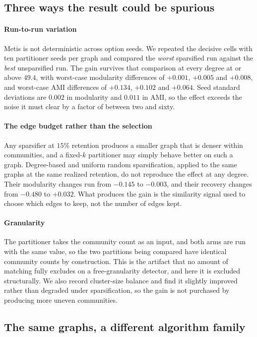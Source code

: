 \subsection{Three ways the result could be spurious}

\paragraph{Run-to-run variation}
Metis is not deterministic across option seeds. We repeated the decisive cells
with ten partitioner seeds per graph and compared the \emph{worst} sparsified run
against the \emph{best} unsparsified run. The gain survives that comparison at
every degree at or above $49.4$, with worst-case modularity differences of
$+0.001$, $+0.005$ and $+0.008$, and worst-case AMI differences of $+0.134$,
$+0.102$ and $+0.064$. Seed standard deviations are $0.002$ in modularity and
$0.011$ in AMI, so the effect exceeds the noise it must clear by a factor of
between two and sixty.

\paragraph{The edge budget rather than the selection}
Any sparsifier at $15\%$ retention produces a smaller graph that is denser within
communities, and a fixed-$k$ partitioner may simply behave better on such a
graph. Degree-based and uniform random sparsification, applied to the same graphs
at the same realized retention, do not reproduce the effect at any degree. Their
modularity changes run from $-0.145$ to $-0.003$, and their recovery changes from
$-0.480$ to $+0.032$. What produces the gain is the similarity signal used to
choose which edges to keep, not the number of edges kept.

\paragraph{Granularity}
The partitioner takes the community count as an input, and both arms are run with
the same value, so the two partitions being compared have identical community
counts by construction. This is the artifact that no amount of matching fully
excludes on a free-granularity detector, and here it is excluded structurally. We
also record cluster-size balance and find it slightly improved rather than
degraded under sparsification, so the gain is not purchased by producing more
uneven communities.

\subsection{The same graphs, a different algorithm family}

